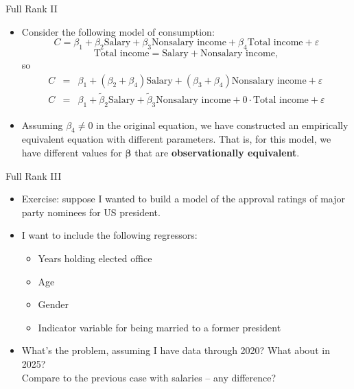 \documentclass[aspectratio=169,11pt]{beamer}
\begin{document}
\begin{frame}{Full Rank II}
\begin{itemize}

	\item Consider the following model of consumption:\[ 
	C = \beta_1 + \beta_2 \text{Salary} + \beta_3 \text{Nonsalary income} + \beta_4 \text{Total income} + \varepsilon
	\]
	\smallskip
\[
	\text{Total income}  = \text{Salary} + \text{Nonsalary income},
	\]
	so\[
\begin{array}{ccl}
C & = & \beta_{1}+\left(\beta_{2}+\beta_{4}\right)\text{Salary}+\left(\beta_{3}+\beta_{4}\right)\text{Nonsalary income}+\varepsilon\\
C & = & \beta_{1}+\widetilde{\beta}_{2}\text{Salary}+\widetilde{\beta}_{3}\text{Nonsalary income}+0\cdot\text{Total income}+\varepsilon
\end{array}
\]

	\smallskip
	\item Assuming $\beta_{4}\ne 0$ in the original equation, we have constructed an empirically equivalent equation with different parameters.
         That is, for this model, we have different values for $\boldsymbol{\beta}$ that are {\bf observationally equivalent}. 

\end{itemize}
\end{frame}


\begin{frame}{Full Rank III}
\begin{itemize}

	\item Exercise: suppose I wanted to build a model of the approval ratings of major party nominees 
	for US president. 

	\item I want to include the following regressors:
	\begin{itemize}
		\item Years holding elected office
		\item Age
		\item Gender
		\item Indicator variable for being married to a former president
	\end{itemize}

	\item What's the problem, assuming I have data through 2020? What about in 2025? \\ Compare to the previous case with salaries -- any difference? 



\end{itemize}
\end{frame}
\end{document}
